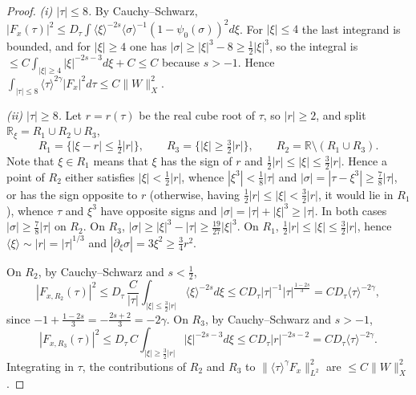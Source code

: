 \documentclass[10pt,a4paper]{amsart}
\newcommand{\R}{\mathbb R}
\newcommand{\ga}{\gamma}
\newcommand{\lan}{\langle}
\newcommand{\pd}{\partial}
\newcommand{\ran}{\rangle}
\newcommand{\sig}{\sigma}
\theoremstyle{plain}
\theoremstyle{remark}
\begin{document}
\begin{proof}
\emph{(i) $|\tau|\le8$.} By Cauchy--Schwarz, $|F_x(\tau)|^2\le D_\tau\int\lan\xi\ran^{-2s}\lan\sig\ran^{-1}(1-\psi_0(\sig))^2d\xi$. For $|\xi|\le4$ the last integrand is bounded, and for $|\xi|\ge4$ one has $|\sig|\ge|\xi|^3-8\ge\frac12|\xi|^3$, so the integral is $\le C\int_{|\xi|\ge4}|\xi|^{-2s-3}d\xi+C\le C$ because $s>-1$. Hence $\int_{|\tau|\le8}\lan\tau\ran^{2\ga}|F_x|^2d\tau\le C\|W\|_X^2$.

\emph{(ii) $|\tau|\ge8$.} Let $r=r(\tau)$ be the real cube root of $\tau$, so $|r|\ge2$, and split $\R_\xi=R_1\cup R_2\cup R_3$,
$$R_1=\{|\xi-r|\le\tfrac12|r|\},\qquad R_3=\{|\xi|\ge\tfrac32|r|\},\qquad R_2=\R\setminus(R_1\cup R_3).$$
Note that $\xi\in R_1$ means that $\xi$ has the sign of $r$ and $\frac12|r|\le|\xi|\le\frac32|r|$. Hence a point of $R_2$ either satisfies $|\xi|<\frac12|r|$, whence $|\xi^3|<\frac18|\tau|$ and $|\sig|=|\tau-\xi^3|\ge\frac78|\tau|$, or has the sign opposite to $r$ (otherwise, having $\frac12|r|\le|\xi|<\frac32|r|$, it would lie in $R_1$), whence $\tau$ and $\xi^3$ have opposite signs and $|\sig|=|\tau|+|\xi|^3\ge|\tau|$. In both cases $|\sig|\ge\frac78|\tau|$ on $R_2$. On $R_3$, $|\sig|\ge|\xi|^3-|\tau|\ge\frac{19}{27}|\xi|^3$. On $R_1$, $\frac12|r|\le|\xi|\le\frac32|r|$, hence $\lan\xi\ran\sim|r|=|\tau|^{1/3}$ and $|\pd_\xi\sig|=3\xi^2\ge\frac34r^2$.

On $R_2$, by Cauchy--Schwarz and $s<\frac12$,
$$|F_{x,R_2}(\tau)|^2\le D_\tau\,\frac{C}{|\tau|}\int_{|\xi|\le\frac32|r|}\lan\xi\ran^{-2s}d\xi\le C D_\tau|\tau|^{-1}|\tau|^{\frac{1-2s}3}=CD_\tau\lan\tau\ran^{-2\ga},$$
since $-1+\frac{1-2s}3=-\frac{2s+2}3=-2\ga$. On $R_3$, by Cauchy--Schwarz and $s>-1$,
$$|F_{x,R_3}(\tau)|^2\le D_\tau\, C\int_{|\xi|\ge\frac32|r|}|\xi|^{-2s-3}d\xi\le CD_\tau|r|^{-2s-2}=CD_\tau\lan\tau\ran^{-2\ga}.$$
Integrating in $\tau$, the contributions of $R_2$ and $R_3$ to $\|\lan\tau\ran^\ga F_x\|_{L^2}^2$ are $\le C\|W\|_X^2$.


\end{proof}
\end{document}
